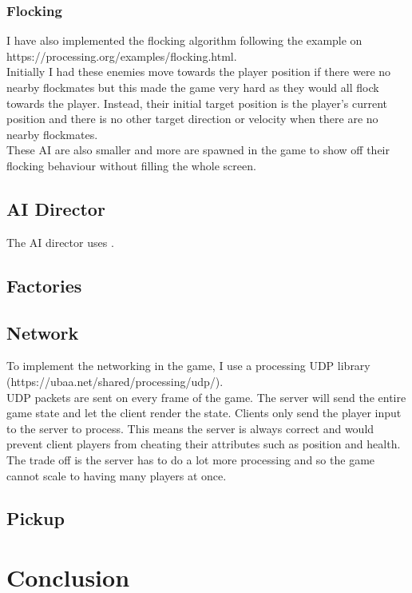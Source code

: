 \documentclass{article}
\newcommand{\n}[0]{\\[\baselineskip]}
\begin{document}
\subsubsection{Flocking}
I have also implemented the flocking algorithm following the example on https://processing.org/examples/flocking.html. 
\n
Initially I had these enemies move towards the player position if there were no nearby flockmates but this made the game very hard as they would all flock towards the player. Instead, their initial target position is the player's current position and there is no other target direction or velocity when there are no nearby flockmates. 
\n
These AI are also smaller and more are spawned in the game to show off their flocking behaviour without filling the whole screen.

\subsection{AI Director}
The AI director uses \cite{l4d}.


\subsection{Factories}

\subsection{Network}
To implement the networking in the game, I use a processing UDP library (https://ubaa.net/shared/processing/udp/).
\n
UDP packets are sent on every frame of the game. The server will send the entire game state and let the client render the state. Clients only send the player input to the server to process. This means the server is always correct and would prevent client players from cheating their attributes such as position and health. The trade off is the server has to do a lot more processing and so the game cannot scale to having many players at once.


\subsection{Pickup}

\section{Conclusion}


\printbibliography
\end{document}
